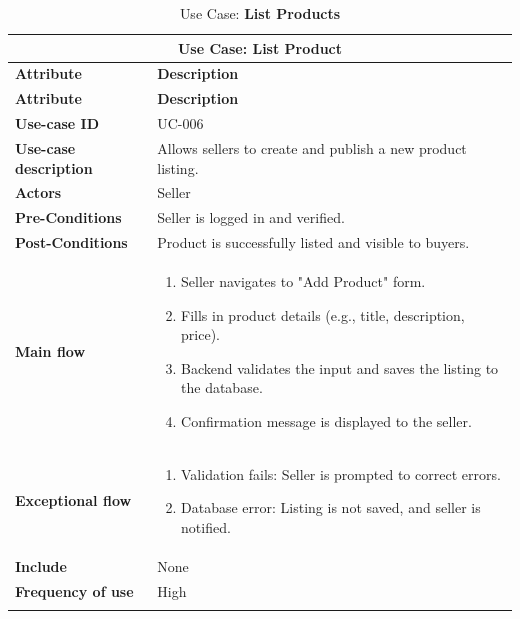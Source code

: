 \documentclass[12pt]{report}
\begin{document}
\begin{appendices}
	\begin{longtable}[H]{|l|p{9cm}||}
		\hline
		\multicolumn{2}{|c||}{\textbf{Use Case: List Product}}                                                  \\
		\hline
		\textbf{Attribute}            & \textbf{Description}                                                    \\
		\hline
		\endfirsthead
		\hline
		\textbf{Attribute}            & \textbf{Description}                                                    \\
		\hline
		\endhead
		\textbf{Use-case ID}          & UC-006                                                                  \\
		\hline
		\textbf{Use-case description} & Allows sellers to create and publish a new product listing.             \\
		\hline
		\textbf{Actors}               & Seller                                                                  \\
		\hline
		\textbf{Pre-Conditions}       & Seller is logged in and verified.                                       \\
		\hline
		\textbf{Post-Conditions}      & Product is successfully listed and visible to buyers.                   \\
		\hline
		\textbf{Main flow}            & \begin{enumerate}
			                                \item Seller navigates to "Add Product" form.
			                                \item Fills in product details (e.g., title, description, price).
			                                \item Backend validates the input and saves the listing to the database.
			                                \item Confirmation message is displayed to the seller.
		                                \end{enumerate} \\
		\hline
		\textbf{Exceptional flow}     & \begin{enumerate}
			                                \item Validation fails: Seller is prompted to correct errors.
			                                \item Database error: Listing is not saved, and seller is notified.
		                                \end{enumerate}      \\
		\hline
		\textbf{Include}              & None                                                                    \\
		\hline
		\textbf{Frequency of use}     & High                                                                    \\
		\hline
		\hline
		\caption{Use Case: \textbf{List Products}}\label{tab:tableListProducts}
	\end{longtable}


\end{appendices}
\end{document}
